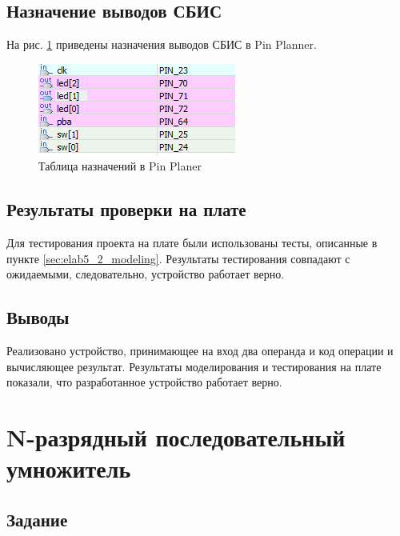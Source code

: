 \newpage

\subsection{Назначение выводов СБИС}

На рис. \ref{fig:elab5_2_pins} приведены назначения выводов СБИС в Pin Planner.

\begin{figure}[H]
\begin{center}
	\includegraphics{elab5_2_pins}
	\caption{Таблица назначений в Pin Planer}
	\label{fig:elab5_2_pins}
\end{center}
\end{figure}

\subsection{Результаты проверки на плате}

Для тестирования проекта на плате были использованы тесты, описанные в пункте \ref{sec:elab5_2_modeling}. Результаты тестирования совпадают с ожидаемыми, следовательно, устройство работает верно.

\subsection{Выводы}

Реализовано устройство, принимающее на вход два операнда и код операции и вычисляющее результат. Результаты моделирования и тестирования на плате показали, что разработанное устройство работает верно.

\newpage

\graphicspath{{../lab6/pics/}}

\section{N-разрядный последовательный умножитель}

\subsection{Задание}

